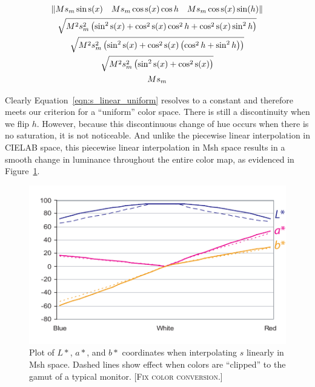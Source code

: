 \documentclass[review,journal]{vgtc}         %
\newcommand{\sticky}[1]{\textsc{[#1]}}
\newcommand{\Lab}{CIELAB\xspace}
\newcommand{\Msh}{Msh\xspace}
\begin{document}
\begin{equation}
  \begin{gathered}
    \left\lVert M s_m \sin\operatorname{s}(x) \quad
        M s_m \cos\operatorname{s}(x) \cos h \quad
        M s_m \cos\operatorname{s}(x) \sin(h) \right\rVert \\
    \sqrtsign{ M^2 s_m^2 \left( \sin^2 \operatorname{s}(x)
        + \cos^2 \operatorname{s}(x) \cos^2 h
        + \cos^2 \operatorname{s}(x) \sin^2 h \right) } \\
    \sqrtsign{ M^2 s_m^2 \left( \sin^2 \operatorname{s}(x)
        + \cos^2 \operatorname{s}(x) \left( \cos^2 h
          + \sin^2 h \right) \right) } \\
    \sqrtsign{ M^2 s_m^2 \left( \sin^2 \operatorname{s}(x)
        + \cos^2 \operatorname{s}(x) \right) } \\
    M s_m
    \label{eqn:s_linear_uniform}
  \end{gathered}
\end{equation}

Clearly Equation~\ref{eqn:s_linear_uniform} resolves to a constant and
therefore meets our criterion for a ``uniform'' color space.  There is still
a discontinuity when we flip $h$.  However, because this discontinuous
change of hue occurs when there is no saturation, it is not noticeable.
And unlike the piecewise linear interpolation in \Lab space, this piecewise
linear interpolation in \Msh space results in a smooth change in luminance
throughout the entire color map, as evidenced in Figure~\ref{fig:s_plot}.

\begin{figure}
  \centering
  \includegraphics{images/LinearMshPlot}
  \caption{Plot of $L*$, $a*$, and $b*$ coordinates when interpolating $s$
    linearly in \Msh space.  Dashed lines show effect when colors are
    ``clipped'' to the gamut of a typical monitor. \sticky{Fix color conversion.}}
  \label{fig:s_plot}
\end{figure}
\end{document}
